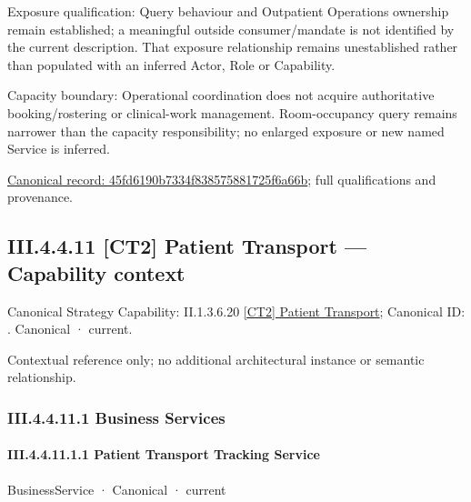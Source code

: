 Exposure qualification: Query behaviour and Outpatient Operations ownership remain established; a meaningful outside consumer/mandate is not identified by the current description. That exposure relationship remains unestablished rather than populated with an inferred Actor, Role or Capability.



Capacity boundary: Operational coordination does not acquire authoritative booking/rostering or clinical-work management. Room-occupancy query remains narrower than the capacity responsibility; no enlarged exposure or new named Service is inferred.


{\footnotesize \href{../../../../../../../continuum/business/business-function/45fd6190b7334f838575881725f6a66b.md}{Canonical record: 45fd6190b7334f838575881725f6a66b}; full qualifications and provenance.}\par
\subsection*{III.4.4.11 [CT2] Patient Transport — Capability context}
\label{navigation:III.4.4.11}

{\small Canonical Strategy Capability: II.1.3.6.20 \hyperref[element:6041d7c0cc5d4519aaea584bb4e6d365]{[CT2] Patient Transport}; Canonical ID: \texttt{}. Canonical · current.}\par
Contextual reference only; no additional architectural instance or semantic relationship.\par
\subsubsection*{III.4.4.11.1 Business Services}
\label{navigation:III.4.4.11.1}

\paragraph*{III.4.4.11.1.1 Patient Transport Tracking Service}
\label{navigation:III.4.4.11.1.1}

\label{element:8d71168ac7da48e990757b2a0ae3670f}
{\small BusinessService · Canonical · current}\par

